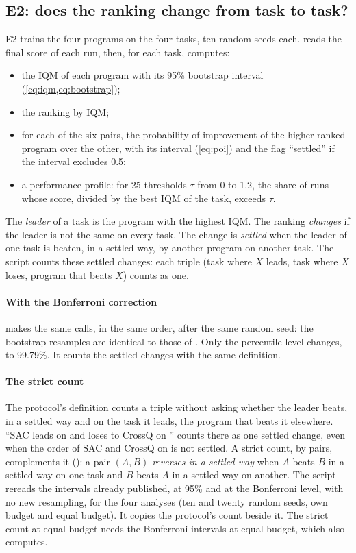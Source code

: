 \subsection{E2: does the ranking change from task to task?}\label{sec:plan-e2}
E2 trains the four programs on the four tasks, ten random seeds each.  reads the final
score of each run, then, for each task, computes:
\begin{itemize}
  \item the IQM of each program with its 95\% bootstrap interval (\cref{eq:iqm,eq:bootstrap});
  \item the ranking by IQM;
  \item for each of the six pairs, the probability of improvement of the higher-ranked program over the
    other, with its interval (\cref{eq:poi}) and the flag \enquote{settled} if the interval excludes 0.5;
  \item a performance profile: for 25 thresholds $\tau$ from 0 to 1.2, the share of runs whose score, divided
    by the best IQM of the task, exceeds $\tau$.
\end{itemize}
The \emph{leader} of a task is the program with the highest IQM. The ranking \emph{changes} if the leader is
not the same on every task. The change is \emph{settled} when the leader of one task is beaten, in a
settled way, by another program on another task. The script counts these settled changes: each triple
(task where $X$ leads, task where $X$ loses, program that beats $X$) counts as one.

\paragraph{With the Bonferroni correction}
 makes the same calls, in the same order, after the same random seed: the
bootstrap resamples are identical to those of . Only the percentile level changes, to
99.79\%. It counts the settled changes with the same definition.

\paragraph{The strict count}
The protocol's definition counts a triple without asking whether the leader beats, in a settled way and on the
task it leads, the program that beats it elsewhere. \enquote{SAC leads on  and loses to CrossQ on
} counts there as one settled change, even when the order of SAC and CrossQ on
 is not settled. A strict count, by pairs, complements it
(): a pair $(A,B)$ \emph{reverses in a settled way} when $A$ beats $B$ in a
settled way on one task and $B$ beats $A$ in a settled way on another. The script rereads the intervals already
published, at 95\% and at the Bonferroni level, with no new resampling, for the four analyses (ten and twenty
random seeds, own budget and equal budget). It copies the protocol's count beside it. The strict count at
equal budget needs the Bonferroni intervals at equal budget, which  also
computes.


